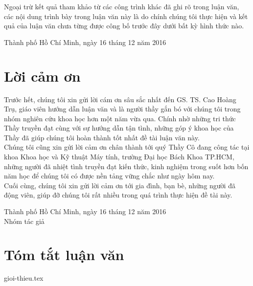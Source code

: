 \documentclass[a4paper, 12pt]{article}
\theoremstyle{definition}
\begin{document}
Ngoại trừ kết quả tham khảo từ các công trình khác đã ghi rõ trong luận văn, các nội dung trình bày trong luận văn này là do chính chúng tôi thực hiện và kết quả của luận văn chưa từng được công bố trước đây dưới bất kỳ hình thức nào.\\

\begin{flushright}
Thành phố Hồ Chí Minh, ngày 16 tháng 12 năm 2016
\end{flushright}

\pagebreak
\section*{Lời cảm ơn}
Trước hết, chúng tôi xin gửi lời cám ơn sâu sắc nhất đến GS. TS. Cao Hoàng Trụ, giáo viên hướng dẫn luận văn và là người thầy gắn bó với chúng tôi trong nhóm nghiên cứu khoa học hơn một năm vừa qua. Chính nhờ những tri thức Thầy truyền đạt cùng với sự hướng dẫn tận tình, những góp ý khoa học của Thầy đã giúp chúng tôi hoàn thành tốt nhất đề tài luận văn này.\\

Chúng tôi cũng xin gửi lời cảm ơn chân thành tới quý Thầy Cô đang công tác tại khoa Khoa học và Kỹ thuật Máy tính, trường Đại học Bách Khoa TP.HCM, những người đã nhiệt tình truyền đạt kiến thức, kinh nghiệm trong suốt hơn bốn năm học để chúng tôi có được nền tảng vững chắc như ngày hôm nay.\\

Cuối cùng, chúng tôi xin gửi lời cảm ơn tới gia đình, bạn bè, những người đã động viên, giúp đỡ chúng tôi rất nhiều trong quá trình thực hiện đề tài này.\\

\begin{flushright}
Thành phố Hồ Chí Minh, ngày 16 tháng 12 năm 2016\\

Nhóm tác giả
\end{flushright}
\pagebreak
\section*{Tóm tắt luận văn}


\pagebreak
\tableofcontents

\thispagestyle{empty}
\pagebreak
\listoffigures
\pagebreak
\listoftables

\pagebreak
{gioi-thieu.tex}
\pagebreak
\end{document}
